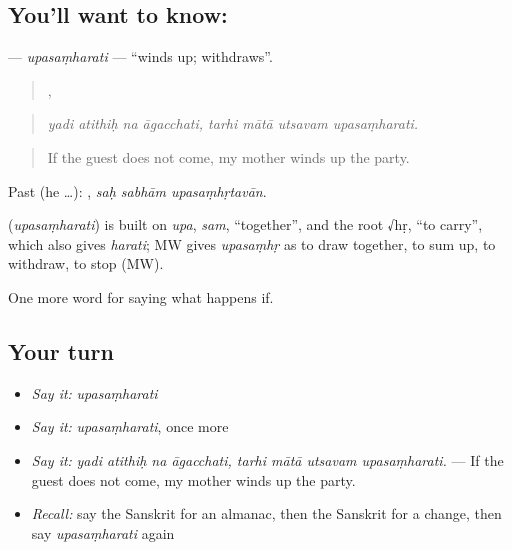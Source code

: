 \subsection*{You'll want to know: }
\textbf{} — \emph{upasaṃharati} — \textquotedblleft{}winds up; withdraws\textquotedblright{}.

\begin{quote}
   ,    
\end{quote}

\begin{quote}
\emph{yadi atithiḥ na āgacchati, tarhi mātā utsavam upasaṃharati.}
\end{quote}

\begin{quote}
If the guest does not come, my mother winds up the party.
\end{quote}

Past (he …):   , \emph{saḥ sabhām upasaṃhṛtavān}.

\begin{cousinweb}
\textbf{} (\emph{upasaṃharati}) is built on \emph{upa}, \emph{sam}, \textquotedblleft{}together\textquotedblright{}, and the root √hṛ, \textquotedblleft{}to carry\textquotedblright{}, which also gives \emph{harati}; MW gives \emph{upasaṃhṛ} as to draw together, to sum up, to withdraw, to stop (MW).
\end{cousinweb}

\begin{grammarlens}[title={What you've built}]
One more word for saying what happens if.
\end{grammarlens}

\subsection*{Your turn}
\begin{itemize}
\raggedright
  \item \emph{Say it:} \emph{upasaṃharati}
  \item \emph{Say it:} \emph{upasaṃharati}, once more
  \item \emph{Say it:} \emph{yadi atithiḥ na āgacchati, tarhi mātā utsavam upasaṃharati.} — If the guest does not come, my mother winds up the party.
  \item \emph{Recall:} say the Sanskrit for an almanac, then the Sanskrit for a change, then say \emph{upasaṃharati} again
\end{itemize}

